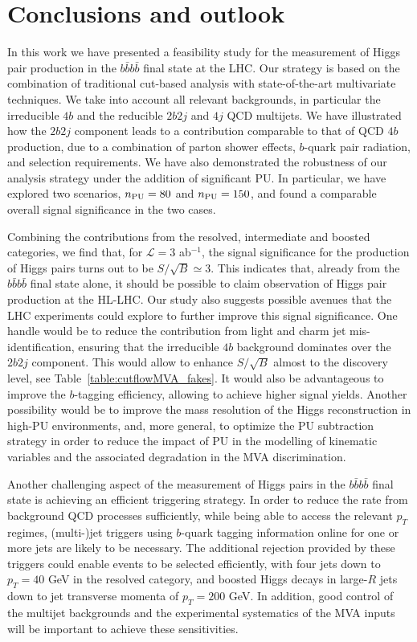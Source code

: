 \section{Conclusions and outlook}
\label{sec:conclusions}

In this work we have presented a feasibility study for
 the measurement of Higgs pair production in the $b\bar{b}b\bar{b}$
final state at the LHC.
%
Our strategy is based on the combination of traditional
cut-based analysis with state-of-the-art multivariate techniques.
%
We take into account 
all relevant backgrounds, in particular
the irreducible $4b$
and the reducible 
$2b2j$ and $4j$ QCD multijets.
%
We have illustrated how the $2b2j$ component leads to
a contribution comparable to that of QCD $4b$ production,
due to a combination of  parton shower effects, $b$-quark 
pair radiation, and selection requirements.
%
We have also demonstrated the robustness of our analysis strategy
under the addition of significant PU.
%
In particular, we have explored two scenarios, $n_{\rm PU}=80$ and
$n_{\rm PU}=150$, and found a comparable overall signal significance
in the two cases.

Combining the contributions from the resolved,
intermediate and boosted categories, we find that, for
$\mathcal{L}=3$ ab$^{-1}$, the
signal significance for
the production of Higgs pairs turns out to be $S/\sqrt{B}\simeq 3$.
%
This indicates that, already from the $b\bar{b}b\bar{b}$
final state alone,
it should be possible to claim observation of Higgs pair production at
the HL-LHC.
%
Our study also suggests possible avenues that the LHC experiments
could explore to further improve this signal significance.
%
One handle would be to reduce the contribution from light and charm
jet mis-identification, ensuring that the irreducible $4b$ background 
dominates over the $2b2j$ component.
%
This would allow to enhance  $S/\sqrt{B}$ almost to the discovery
level, see Table~\ref{table:cutflowMVA_fakes}.
%
It would also be advantageous to improve the $b$-tagging efficiency, allowing
to achieve higher signal yields.
%
Another possibility would be to improve the mass resolution of the Higgs
reconstruction
in high-PU environments, and, more general,
to optimize the PU subtraction
strategy in order
to reduce the impact of PU in the modelling
of kinematic variables and the associated
degradation in the MVA discrimination.
%


Another challenging aspect of the measurement of Higgs pairs
in the $b\bar{b}b\bar{b}$ final state is achieving an efficient
triggering strategy.
%
In order to reduce the rate from background QCD processes sufficiently, while
being able
to access the relevant $p_T$ regimes, (multi-)jet triggers
using $b$-quark tagging information online for one or more jets are
likely to be
necessary.
%
The additional rejection provided by these triggers could
enable events to be selected efficiently, with four
jets down to $p_T=40$ GeV in the resolved category,
and boosted Higgs decays in large-$R$ jets down to jet transverse momenta of
$p_T=200$ GeV.
%
In addition,
good control of the multijet backgrounds and the
experimental systematics of the MVA inputs will be important to achieve
these sensitivities.


